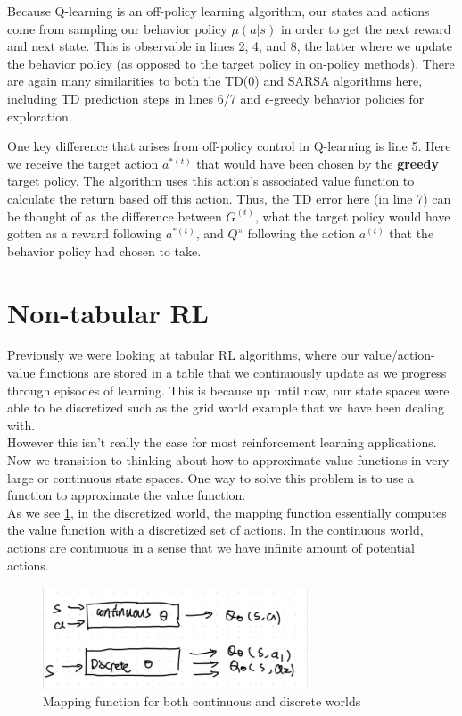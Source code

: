 \documentclass[11pt]{article}
\begin{document}
Because Q-learning is an off-policy learning algorithm, our states and actions come from sampling our behavior policy $\mu(a|s)$ in order to get the next reward and next state. This is observable in lines 2, 4, and 8, the latter where we update the behavior policy (as opposed to the target policy in on-policy methods). There are again many similarities to both the TD(0) and SARSA algorithms here, including TD prediction steps in lines 6/7 and $\epsilon$-greedy behavior policies for exploration.

One key difference that arises from off-policy control in Q-learning is line 5. Here we receive the target action $a^{*(t)}$ that would have been chosen by the \textbf{greedy} target policy. The algorithm uses this action's associated value function to calculate the return based off this action. Thus, the TD error here (in line 7) can be thought of as the difference between $G^{(t)}$, what the target policy would have gotten as a reward following $a^{*(t)}$, and $Q^{\pi}$ following the action $a^{(t)}$ that the behavior policy had chosen to take.



\section{Non-tabular RL}

Previously we were looking at tabular RL algorithms, where our value/action-value functions are stored in a table that we continuously update as we progress through episodes of learning. This is because up until now, our state spaces were able to be discretized such as the grid world example that we have been dealing with.\\

However this isn't really the case for most reinforcement learning applications. Now we transition to thinking about how to approximate value functions in very large or continuous state spaces. One way to solve this problem is to use a function to approximate the value function. \\

As we see \ref{fig:approximator}, in the discretized world, the mapping function essentially computes the value function with a discretized set of actions. In the continuous world, actions are continuous in a sense that we have infinite amount of potential actions.
\begin{figure}[H]
    \centering
    \includegraphics[width=0.7\textwidth]{images/pic1.png}
    \caption{Mapping function for both continuous and discrete worlds}
    \label{fig:approximator}
\end{figure}
\end{document}
